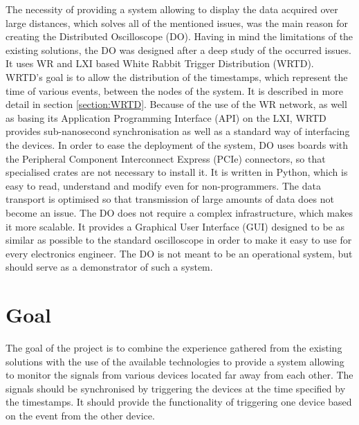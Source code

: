     The necessity of providing a system allowing to display the data acquired over large distances, which solves all of the mentioned issues, was the main reason for creating the Distributed Oscilloscope (DO). Having in mind the limitations of the existing solutions, the DO was designed after a deep study of the occurred issues. It uses WR and LXI based White Rabbit Trigger Distribution (WRTD). WRTD's goal is to allow the distribution of the timestamps, which represent the time of various events, between the nodes of the system. It is described in more detail in section \ref{section:WRTD}. Because of the use of the WR network, as well as basing its Application Programming Interface (API) on the LXI, WRTD provides sub-nanosecond synchronisation as well as a standard way of interfacing the devices. In order to ease the deployment of the system, DO uses boards with the Peripheral Component Interconnect Express (PCIe) connectors, so that specialised crates are not necessary to install it. It is written in Python, which is easy to read, understand and modify even for non-programmers. The data transport is optimised so that transmission of large amounts of data does not become an issue. The DO does not require a complex infrastructure, which makes it more scalable. It provides a Graphical User Interface (GUI) designed to be as similar as possible to the standard oscilloscope in order to make it easy to use for every electronics engineer. The DO is not meant to be an operational system, but should serve as a demonstrator of such a system.

\section{Goal} \label{section:goal}
    The goal of the project is to combine the experience gathered from the existing solutions with the use of the available technologies to provide a system allowing to monitor the signals from various devices located far away from each other. The signals should be synchronised by triggering the devices at the time specified by the timestamps. It should provide the functionality of triggering one device based on the event from the other device.

